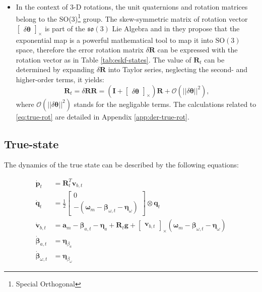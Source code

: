 \begin{itemize}
    \item 
    In the context of 3-D rotations, the unit quaternions and rotation matrices belong to the SO(3)\footnote{Special Orthogonal} group. The skew-symmetric matrix of rotation vector $\begin{bmatrix} \delta\boldsymbol{\theta} \end{bmatrix}_\times$ is part of the $\mathfrak{so}(3)$ Lie Algebra and in \cite{quaternion-eskf} they propose that the exponential map is a powerful mathematical tool to map it into $\mathrm{SO}(3)$ space, therefore the error rotation matrix $\delta\mathbf{R}$ can be expressed with the rotation vector as in Table \ref{tab:eskf-states}. The value of $\mathbf{R}_t$ can be determined by expanding $\delta\mathbf{R}$ into Taylor series, neglecting the second- and higher-order terms, it yields:
    \begin{equation}
         \mathbf{R}_t=\delta\mathbf{R}\mathbf{R}=\left(\mathbf{I} +\begin{bmatrix} \delta\boldsymbol{\theta} \end{bmatrix}_\times\right) \mathbf{R} + \mathcal{O}(||\delta\boldsymbol{\theta}||^2),
    \label{eq:true-rot}
    \end{equation}    
    where $\mathcal{O}(||\delta\boldsymbol{\theta}||^2)$ stands for the negligable terms. The calculations related to \eqref{eq:true-rot} are detailed in Appendix \ref{app:der-true-rot}.
\end{itemize} 


\subsection*{True-state}

The dynamics of the true state can be described by the following equations:

\begin{subequations}
    \begin{align}
        \dot{\mathbf{p}}_{t}&=\mathbf{R}_t^T \mathbf{v}_{b,t} \\
        \dot{\mathbf{q}}_{t}&=\frac{1}{2}\begin{bmatrix}0\\ -(\boldsymbol{\omega}_m-\boldsymbol{\beta}_{\omega, t}-\boldsymbol{\eta}_{\omega}) \end{bmatrix}\otimes \mathbf{q}_{t} \label{subeq:true-q} \\
        \dot{\mathbf{v}}_{b,t}&=\mathbf{a}_m-\boldsymbol{\beta}_{a,t}-\boldsymbol{\eta}_a +\mathbf{R}_t\mathbf{g} + \begin{bmatrix}\mathbf{v}_{b,t} \end{bmatrix}_{\times}(\boldsymbol{\omega}_m-\boldsymbol{\beta}_{\omega,t} -\boldsymbol{\eta}_\omega) \label{subeq:true-vb}\\
        \dot{\boldsymbol{\beta}}_{a,t}&=\boldsymbol{\eta}_{\beta_a} \label{subeq:true-ba}\\
        \dot{\boldsymbol{\beta}}_{\omega,t}&=\boldsymbol{\eta}_{\beta_\omega} \label{subeq:true-bw}
    \end{align}
    \label{eq:true-state}
\end{subequations}


